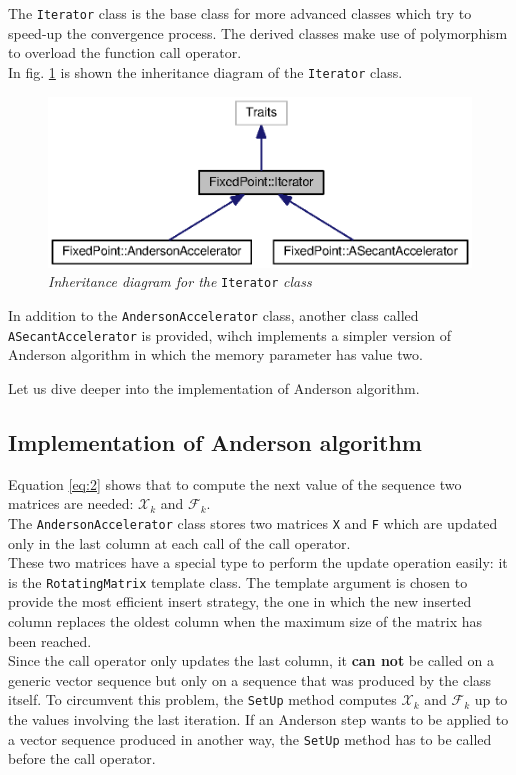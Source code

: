 \documentclass[12pt]{article}
\begin{document}
		The \verb|Iterator| class is the base class for more advanced classes which try to speed-up the convergence
		process. The derived classes make use of polymorphism to overload the function call operator.\\
		In fig. \ref{fig:1} is shown the inheritance diagram of the \verb|Iterator| class.
		\begin{figure}
			\includegraphics{./Include/inheritance.eps}
			\centering
			\caption{\textit{Inheritance diagram for the} \texttt{Iterator} \textit{class}}
			\label{fig:1}
		\end{figure}
		In addition to the \verb|AndersonAccelerator| class, another class called \verb|ASecantAccelerator| is provided,
		wihch implements a simpler version of Anderson algorithm in which the memory parameter has value two.
		
		Let us dive deeper into the implementation of Anderson algorithm.
		
		
		\subsection {Implementation of Anderson algorithm}
		Equation \ref{eq:2} shows that to compute the next value of the sequence two matrices are needed:
		$\mathscr{X}_k$ and $\mathscr{F}_k$.\\
		The \verb|AndersonAccelerator| class stores two matrices \verb|X| and \verb|F| which are updated 
		only in the last column at each call of the call operator.\\
		These two matrices have a special type to perform the update operation easily: it is the \verb|RotatingMatrix|
		template class. The template argument is chosen to provide the most efficient insert strategy, the one in which
		the new inserted column replaces the oldest column when the maximum size of the matrix has been reached.\\
		Since the call operator only updates the last column, it \textbf{can not} be called on a generic
		vector sequence but only on a sequence that was produced by the class itself.
		To circumvent this problem, the \verb|SetUp| method computes $\mathscr{X}_k$ and $\mathscr{F}_k$ up
		to the values involving the last iteration. If an Anderson step wants to be applied to a vector sequence
		produced in another way, the \verb|SetUp| method has to be called before the call operator.
		
\end{document}
